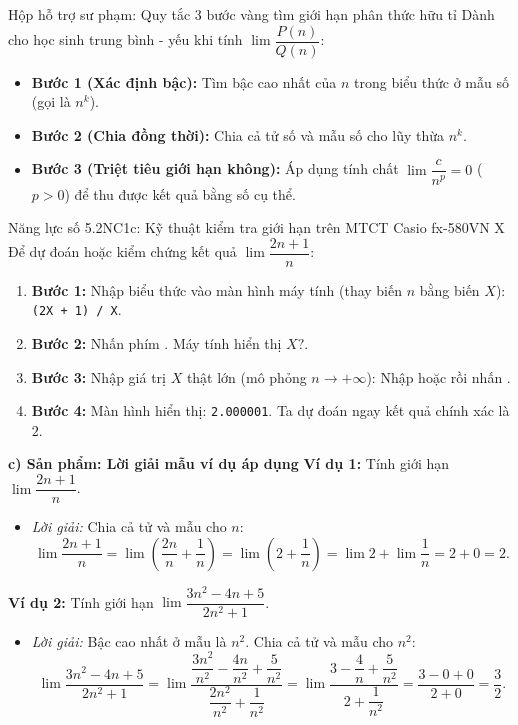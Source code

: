 \documentclass[12pt, a4paper]{article}
\begin{document}
\begin{scaffoldbox}{Hộp hỗ trợ sư phạm: Quy tắc 3 bước vàng tìm giới hạn phân thức hữu tỉ}
Dành cho học sinh trung bình - yếu khi tính $\lim \dfrac{P(n)}{Q(n)}$:
\begin{itemize}[leftmargin=0.6cm]
    \item \textbf{Bước 1 (Xác định bậc):} Tìm bậc cao nhất của $n$ trong biểu thức ở mẫu số (gọi là $n^k$).
    \item \textbf{Bước 2 (Chia đồng thời):} Chia cả tử số và mẫu số cho lũy thừa $n^k$.
    \item \textbf{Bước 3 (Triệt tiêu giới hạn không):} Áp dụng tính chất $\lim \dfrac{c}{n^p} = 0$ ($p > 0$) để thu được kết quả bằng số cụ thể.
\end{itemize}
\end{scaffoldbox}

\begin{aibox}{Năng lực số 5.2NC1c: Kỹ thuật kiểm tra giới hạn trên MTCT Casio fx-580VN X}
Để dự đoán hoặc kiểm chứng kết quả $\lim \dfrac{2n + 1}{n}$:
\begin{enumerate}[leftmargin=0.6cm]
    \item \textbf{Bước 1:} Nhập biểu thức vào màn hình máy tính (thay biến $n$ bằng biến $X$): \texttt{(2X + 1) / X}.
    \item \textbf{Bước 2:} Nhấn phím . Máy tính hiển thị $X?$.
    \item \textbf{Bước 3:} Nhập giá trị $X$ thật lớn (mô phỏng $n \to +\infty$): Nhập  hoặc  rồi nhấn \fbox{\textbf{=}}.
    \item \textbf{Bước 4:} Màn hình hiển thị: \texttt{2.000001}. Ta dự đoán ngay kết quả chính xác là $2$.
\end{enumerate}
\end{aibox}

\noindent \textbf{c) Sản phẩm: Lời giải mẫu ví dụ áp dụng}
\textbf{Ví dụ 1:} Tính giới hạn $\lim \dfrac{2n + 1}{n}$.
\begin{itemize}[leftmargin=0.6cm]
    \item \textit{Lời giải:} Chia cả tử và mẫu cho $n$:
    $$\lim \dfrac{2n + 1}{n} = \lim \left(\dfrac{2n}{n} + \dfrac{1}{n}\right) = \lim \left(2 + \dfrac{1}{n}\right) = \lim 2 + \lim \dfrac{1}{n} = 2 + 0 = 2.$$
\end{itemize}

\textbf{Ví dụ 2:} Tính giới hạn $\lim \dfrac{3n^2 - 4n + 5}{2n^2 + 1}$.
\begin{itemize}[leftmargin=0.6cm]
    \item \textit{Lời giải:} Bậc cao nhất ở mẫu là $n^2$. Chia cả tử và mẫu cho $n^2$:
    $$\lim \dfrac{3n^2 - 4n + 5}{2n^2 + 1} = \lim \dfrac{\dfrac{3n^2}{n^2} - \dfrac{4n}{n^2} + \dfrac{5}{n^2}}{\dfrac{2n^2}{n^2} + \dfrac{1}{n^2}} = \lim \dfrac{3 - \dfrac{4}{n} + \dfrac{5}{n^2}}{2 + \dfrac{1}{n^2}} = \dfrac{3 - 0 + 0}{2 + 0} = \dfrac{3}{2}.$$
\end{itemize}
\end{document}
